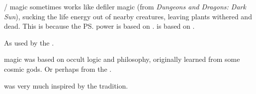 \begin{gloss}
  \Bane/\nieur{} magic sometimes works like defiler magic (from \emph{Dungeons and Dragons: Dark Sun}), sucking the life energy out of nearby creatures, leaving plants withered and dead. This is because the \ps{\banes}{} power is based on . is based on . 
  
  
  
  
  
  
  
  
  
  
  \begin{comment}
    \paragraph{Chaos magic}
  \end{comment}
    As used by the \dragons.
  
  
  
  
  
  
  
  
  
  
  \begin{comment}
    \paragraph{Imetric magic}
  \end{comment}
  
  
  
  
  
  
  
  
  
  
  \begin{comment}\paragraph{\QuilJaaran magic}\end{comment}
  \QuilJaaran{} magic was based on occult logic and philosophy, originally learned from some cosmic gods. 
  Or perhaps from the \voyagers. 
  
   was very much inspired by the \quiljaaran{} tradition.
  
  
  
  
  
  
  
  
  
  
  \begin{comment}

\end{comment}
\end{gloss}
